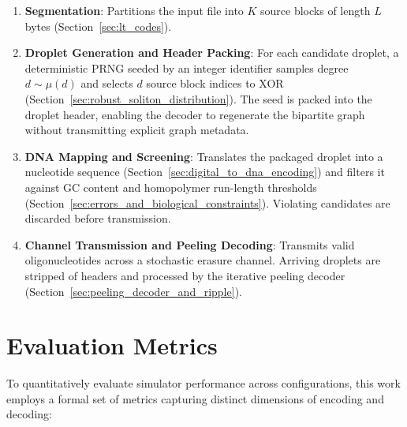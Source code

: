 \begin{enumerate}
    \item \textbf{Segmentation}: Partitions the input file into $K$ source blocks of length $L$ bytes (Section~\ref{sec:lt_codes}).
    
    \item \textbf{Droplet Generation and Header Packing}: For each candidate droplet, a deterministic PRNG seeded by an integer identifier samples degree $d \sim \mu(d)$ and selects $d$ source block indices to XOR (Section~\ref{sec:robust_soliton_distribution}). The seed is packed into the droplet header, enabling the decoder to regenerate the bipartite graph without transmitting explicit graph metadata.
    
    \item \textbf{DNA Mapping and Screening}: Translates the packaged droplet into a nucleotide sequence (Section~\ref{sec:digital_to_dna_encoding}) and filters it against GC content and homopolymer run-length thresholds (Section~\ref{sec:errors_and_biological_constraints}). Violating candidates are discarded before transmission.
    
    \item \textbf{Channel Transmission and Peeling Decoding}: Transmits valid oligonucleotides across a stochastic erasure channel. Arriving droplets are stripped of headers and processed by the iterative peeling decoder (Section~\ref{sec:peeling_decoder_and_ripple}).
\end{enumerate}

\section{Evaluation Metrics}
\label{sec:evaluation_metrics}

To quantitatively evaluate simulator performance across configurations, this work employs a formal set of metrics capturing distinct dimensions of encoding and decoding:

